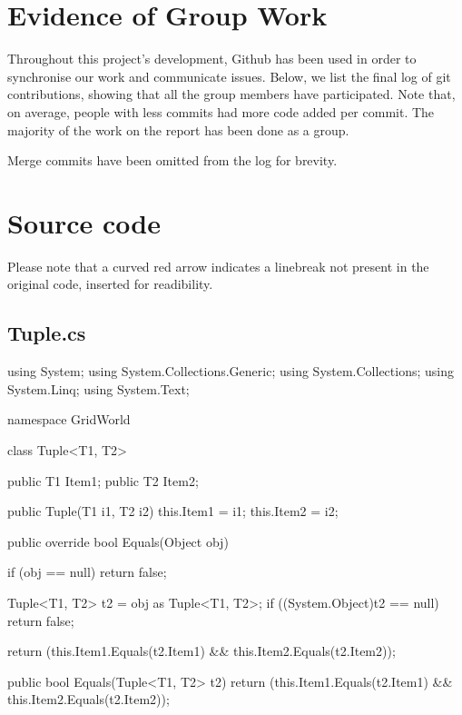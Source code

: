 \documentclass[11pt]{article}
\begin{document}
\newpage
\appendix

\section{Evidence of Group Work}
Throughout this project's development, Github has been used in order to synchronise our work and communicate issues. Below, we list the final log of git contributions, showing that all the group members have participated. Note that, on average, people with less commits had more code added per commit. The majority of the work on the report has been done as a group.

Merge commits have been omitted from the log for brevity.

\section{Source code}
Please note that a curved red arrow indicates a linebreak not present in the original code, inserted for readibility.

\subsection*{Tuple.cs}
\begin{code}
using System;
using System.Collections.Generic;
using System.Collections;
using System.Linq;
using System.Text;

namespace GridWorld
{
    class Tuple<T1, T2> 
    {
        public T1 Item1;
        public T2 Item2;

        public Tuple(T1 i1, T2 i2) {
            this.Item1 = i1;
            this.Item2 = i2;
        }
   
        public override bool Equals(Object obj) {
            if (obj == null)
            {
                return false;
            }

            Tuple<T1, T2> t2 = obj as Tuple<T1, T2>;
            if ((System.Object)t2 == null)
            {
                return false;
            }
            
            return (this.Item1.Equals(t2.Item1) && this.Item2.Equals(t2.Item2));
        }

        public bool Equals(Tuple<T1, T2> t2)
        {
            return (this.Item1.Equals(t2.Item1) && this.Item2.Equals(t2.Item2));
        }
    }
}
\end{code}
\end{document}
